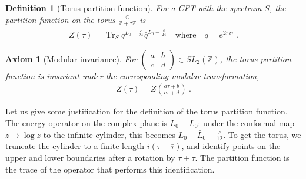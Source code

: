 \documentclass[12pt, a4paper]{article}
\theoremstyle{break}
\newtheorem{hyp}[exo]{Axiom}
\newtheorem{defn}[exo]{Definition}
\begin{document}
\begin{defn}[Torus partition function]
 For a CFT with the spectrum $S$, the partition function on the torus $\frac{\mathbb{C}}{\mathbb{Z}+\tau \mathbb{Z}}$ is 
 \begin{align}
  Z(\tau) = \operatorname{Tr}_S q^{L_0-\frac{c}{24}}\bar q^{\bar L_0-\frac{c}{24}}\quad \text{where} \quad q=e^{2\pi i \tau}\ .
 \end{align}
\end{defn}

\begin{hyp}[Modular invariance]
For $\left(\begin{smallmatrix} a & b \\ c & d\end{smallmatrix}\right)\in SL_2(\mathbb{Z})$, the torus partition function is invariant under the corresponding modular transformation,
\begin{align}
 Z(\tau) = Z\left(\frac{a\tau+b}{c\tau +d} \right)\ .
\end{align}
\end{hyp}
Let us give some justification for the definition of the torus partition function. The energy operator on the complex plane is $L_0+\bar{L}_0$: under the conformal map $z\mapsto \log z$ to the infinite cylinder, this becomes $L_0+\bar{L}_0-\frac{c}{12}$. To get the torus, we truncate the cylinder to a finite length $i(\tau-\bar{\tau})$, and identify points on the upper and lower boundaries after a rotation by $\tau+\bar{\tau}$. The partition function is the trace of the operator that performs this identification.
\end{document}
